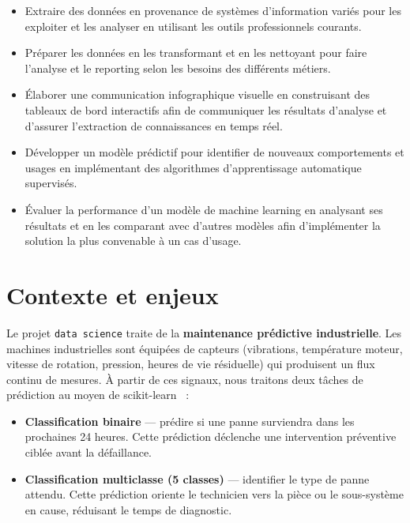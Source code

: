 \documentclass[11pt]{article}
\begin{document}
\begin{itemize}[leftmargin=1.4em, itemsep=3pt, topsep=3pt]
    \item Extraire des données en provenance de systèmes d'information variés pour
    les exploiter et les analyser en utilisant les outils professionnels courants.
    \item Préparer les données en les transformant et en les nettoyant pour faire
    l'analyse et le reporting selon les besoins des différents métiers.
    \item Élaborer une communication infographique visuelle en construisant des
    tableaux de bord interactifs afin de communiquer les résultats d'analyse et
    d'assurer l'extraction de connaissances en temps réel.
    \item Développer un modèle prédictif pour identifier de nouveaux comportements
    et usages en implémentant des algorithmes d'apprentissage automatique supervisés.
    \item Évaluer la performance d'un modèle de machine learning en analysant ses
    résultats et en les comparant avec d'autres modèles afin d'implémenter la
    solution la plus convenable à un cas d'usage.
\end{itemize}

\section{Contexte et enjeux}

Le projet \texttt{data science} traite de la \textbf{maintenance
prédictive industrielle}. Les machines industrielles sont équipées de capteurs
(vibrations, température moteur, vitesse de rotation, pression, heures de vie
résiduelle) qui produisent un flux continu de mesures. À partir de ces signaux,
nous traitons deux tâches de prédiction au moyen de scikit-learn~\cite{sklearn} :

\begin{itemize}[leftmargin=1.4em, itemsep=2pt, topsep=3pt]
    \item \textbf{Classification binaire} --- prédire si une panne surviendra dans
    les prochaines 24 heures. Cette prédiction déclenche une intervention préventive
    ciblée avant la défaillance.
    \item \textbf{Classification multiclasse (5 classes)} --- identifier le type de
    panne attendu. Cette prédiction oriente le technicien vers la pièce ou le
    sous-système en cause, réduisant le temps de diagnostic.
\end{itemize}
\end{document}
